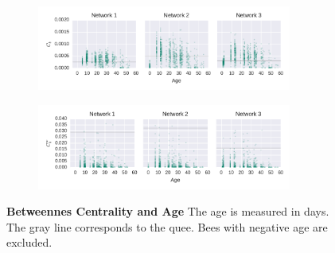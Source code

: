 \begin{figure}[htb]
	\centering
	\begin{subfigure}[b]{1.0\textwidth}
	\centering
	\includegraphics[width=0.92\textwidth]{Figures/stat-betweenAge}
	\label{fig:betweenAgeUW}
	\end{subfigure} 
	\begin{subfigure}[b]{1.0\textwidth}
	\centering
	\includegraphics[width=0.92\textwidth]{Figures/stat-betweenWAge}
	\label{fig:betweenAgeW}
	\end{subfigure}
	\caption[Betweennes Centrality and Age]{\textbf{Betweennes Centrality and Age} The age is measured in days. The gray line corresponds to the quee. Bees with negative age are excluded.}
	\label{fig:betweenAge}
\end{figure}

